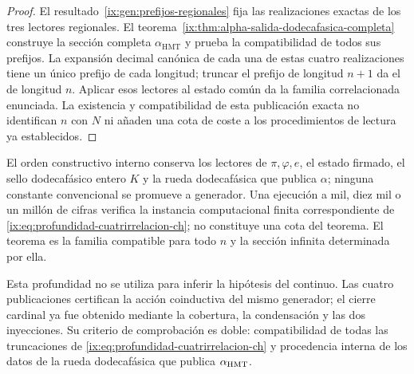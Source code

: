 \begin{proof}
El resultado~\ref{ix:gen:prefijos-regionales} fija las realizaciones exactas
de los tres lectores regionales. El
teorema~\ref{ix:thm:alpha-salida-dodecafasica-completa} construye la sección
completa \(\alpha_{\mathrm{HMT}}\) y prueba la compatibilidad de todos sus
prefijos. La expansión decimal canónica de cada una de estas
cuatro realizaciones tiene un único prefijo de cada longitud; truncar el
prefijo de longitud \(n+1\) da el de longitud \(n\). Aplicar esos lectores
al estado común da la familia correlacionada enunciada. La existencia y
compatibilidad de esta publicación exacta no identifican \(n\) con \(N\)
ni añaden una cota de coste a los procedimientos de lectura ya establecidos.
\end{proof}

El orden constructivo interno conserva los lectores de
\(\pi,\varphi,e\), el estado firmado, el sello dodecafásico entero \(K\) y la rueda
dodecafásica que publica \(\alpha\); ninguna constante convencional se
promueve a generador. Una ejecución a mil, diez mil o un millón de cifras
verifica la instancia computacional finita correspondiente de
\eqref{ix:eq:profundidad-cuatrirrelacion-ch}; no constituye una cota del
teorema. El teorema es la familia compatible para todo \(n\) y la sección
infinita determinada por ella.

Esta profundidad no se utiliza para inferir la hipótesis del continuo. Las cuatro publicaciones
certifican la acción coinductiva del mismo generador; el cierre cardinal ya fue
obtenido mediante la cobertura, la condensación y las dos inyecciones. Su
criterio de comprobación es doble: compatibilidad de todas las truncaciones
de \eqref{ix:eq:profundidad-cuatrirrelacion-ch} y procedencia interna de los
datos de la rueda dodecafásica que publica \(\alpha_{\rm HMT}\).
